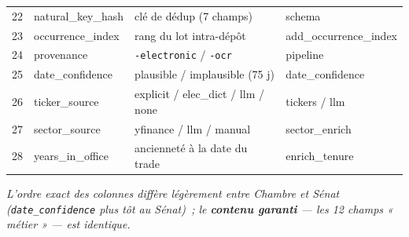 \documentclass[11pt,a4paper]{article}
\newcommand{\co}[1]{\texttt{\small #1}}
\begin{document}
{\begin{longtable}{r >{\ttfamily}p{3.3cm} p{8.2cm} >{\ttfamily\scriptsize}p{3.0cm}}
22 & natural_key_hash & clé de dédup (7 champs) & schema \\
23 & occurrence_index & rang du lot intra-dépôt & add_occurrence_index \\
24 & provenance & \co{*-electronic} / \co{*-ocr} & pipeline \\
25 & date_confidence & plausible / implausible (75 j) & date_confidence \\
26 & ticker_source & explicit / elec\_dict / llm / none & tickers / llm \\
27 & sector_source & yfinance / llm / manual & sector_enrich \\
28 & years_in_office & ancienneté à la date du trade & enrich_tenure \\
\bottomrule
\end{longtable}}
\textit{L'ordre exact des colonnes diffère légèrement entre Chambre et Sénat (\co{date_confidence} plus
tôt au Sénat)~; le \textbf{contenu garanti} — les 12 champs « métier » — est identique.}
\end{document}
